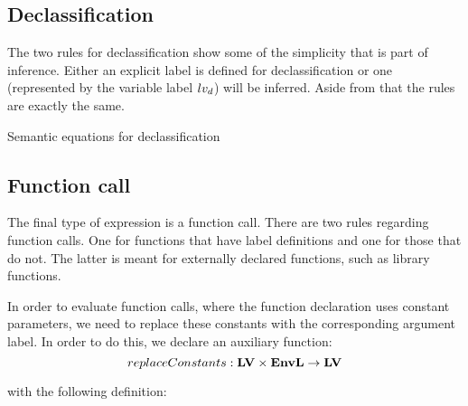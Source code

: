 \subsection{Declassification}
The two rules for declassification show some of the simplicity that is part of inference.
Either an explicit label is defined for declassification or one (represented by the variable label $lv_d$) will be inferred.
Aside from that the rules are exactly the same.

\begin{table}[H]
\begin{semanticequations}
 \seSpace
\end{semanticequations}
\caption{Semantic equations for declassification}
\label{cstr:declassification}
\end{table}

\subsection{Function call}
The final type of expression is a function call.
There are two rules regarding function calls.
One for functions that have label definitions and one for those that do not.
The latter is meant for externally declared functions, such as library functions.

In order to evaluate function calls, where the function declaration uses constant parameters, we need to replace these constants with the corresponding argument label.
In order to do this, we declare an auxiliary function:
\[ replaceConstants : \mathbf{LV} \times \mathbf{EnvL} \rightarrow \mathbf{LV} \]

with the following definition:

